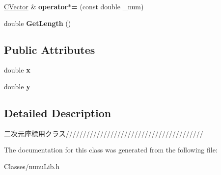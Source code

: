 \begin{DoxyCompactItemize}
\item 
\hyperlink{class_c_vector}{C\+Vector} \& {\bfseries operator$\ast$=} (const double \+\_\+num)\hypertarget{class_c_vector_aecdf38377aa029969ebf53259bdd84c1}{}\label{class_c_vector_aecdf38377aa029969ebf53259bdd84c1}

\item 
double {\bfseries Get\+Length} ()\hypertarget{class_c_vector_a651ef9f5b622461f420996195b2a171d}{}\label{class_c_vector_a651ef9f5b622461f420996195b2a171d}

\end{DoxyCompactItemize}
\subsection*{Public Attributes}
\begin{DoxyCompactItemize}
\item 
double {\bfseries x}\hypertarget{class_c_vector_a937b4dfb43187450487dedb82c73c97c}{}\label{class_c_vector_a937b4dfb43187450487dedb82c73c97c}

\item 
double {\bfseries y}\hypertarget{class_c_vector_a4f7e8df6ec3e09a798ad785fd226e4a7}{}\label{class_c_vector_a4f7e8df6ec3e09a798ad785fd226e4a7}

\end{DoxyCompactItemize}


\subsection{Detailed Description}
二次元座標用クラス//////////////////////////////////////// 

The documentation for this class was generated from the following file\+:\begin{DoxyCompactItemize}
\item 
Classes/nunu\+Lib.\+h\end{DoxyCompactItemize}
